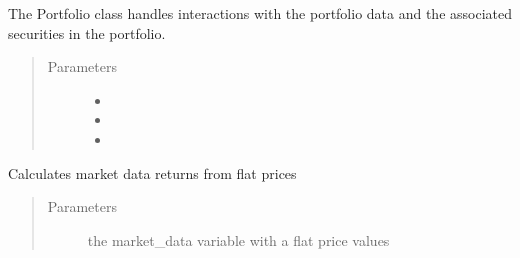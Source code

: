 \documentclass[letterpaper,10pt,english]{sphinxmanual}
\begin{document}

\begin{fulllineitems}
\label{\detokenize{securities:risk_dash.securities.Equity}}
\end{fulllineitems}


\begin{fulllineitems}
\label{\detokenize{securities:risk_dash.securities.Portfolio}}
The Portfolio class handles interactions with the portfolio data and the associated securities in the portfolio.
\begin{quote}\begin{description}
\item[{Parameters}] \leavevmode\begin{itemize}
\item {} 
 \textendash{} 

\item {} 
 \textendash{} 

\item {} 
 \textendash{} 

\end{itemize}

\end{description}\end{quote}

\begin{fulllineitems}
\label{\detokenize{securities:risk_dash.securities.Portfolio.calculate_portfolio_returns}}
Calculates market data returns from flat prices
\begin{quote}\begin{description}
\item[{Parameters}] \leavevmode
{} \textendash{} the market\_data variable with a flat price values


\end{description}
\end{quote}
\end{fulllineitems}
\end{fulllineitems}
\end{document}
